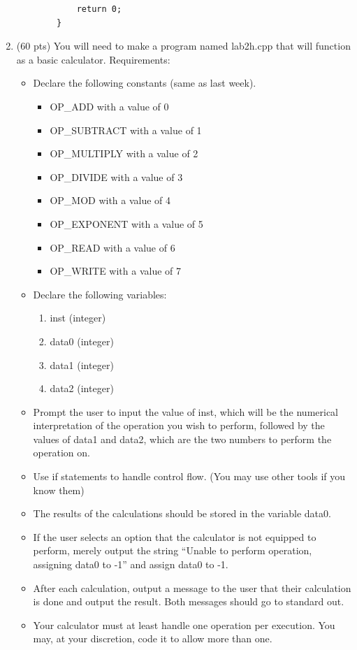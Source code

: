 \documentclass[letterpaper,12pt]{article}
\begin{document}
\begin{enumerate}
\begin{lstlisting}
            return 0;
        }
        \end{lstlisting}
    \item (60 pts) You will need to make a program named lab2h.cpp that will function as a
          basic calculator. Requirements:
        \begin{itemize}
            \item Declare the following constants (same as last week).
            \begin{itemize}
                \item OP\_ADD with a value of 0
                \item OP\_SUBTRACT with a value of 1
                \item OP\_MULTIPLY with a value of 2
                \item OP\_DIVIDE with a value of 3
                \item OP\_MOD with a value of 4
                \item OP\_EXPONENT with a value of 5
                \item OP\_READ with a value of 6
                \item OP\_WRITE with a value of 7
            \end{itemize}
            \item Declare the following variables:
                \begin{enumerate}
                    \item inst (integer)
                    \item data0 (integer)
                    \item data1 (integer)
                    \item data2 (integer)
                \end{enumerate}
            \item Prompt the user to input the value of inst, which will be the numerical
                  interpretation of the operation you wish to perform, followed by the values
                  of data1 and data2, which are the two numbers to perform the operation on.
            \item Use if statements to handle control flow. (You may use other tools if you know them)
            \item The results of the calculations should be stored in the variable data0.
            \item If the user selects an option that the calculator is not equipped to perform,
                  merely output the string “Unable to perform operation, assigning data0 to -1”
                  and assign data0 to -1.
            \item After each calculation, output a message to the user that their calculation is done
                  and output the result. Both messages should go to standard out.
            \item Your calculator must at least handle one operation per execution. You may, at your discretion,
                  code it to allow more than one.
        \end{itemize}

\end{enumerate}
\end{document}
